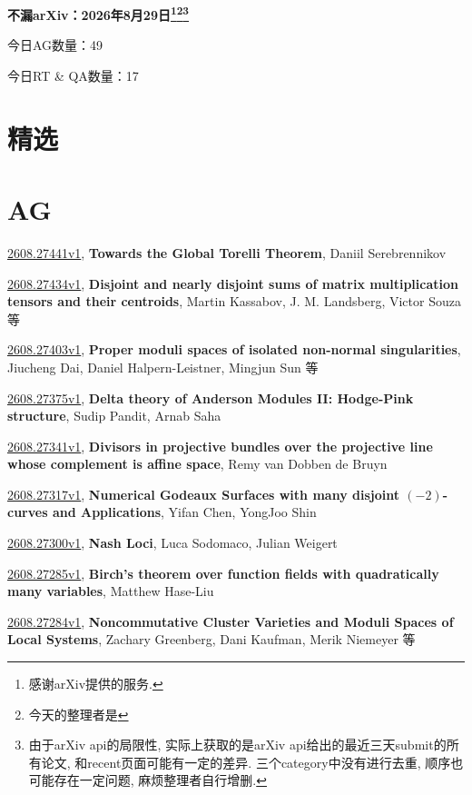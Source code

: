 \documentclass[9pt, a4paper]{article}
\theoremstyle{plain}
\theoremstyle{definition}
\theoremstyle{remark}
\newcommand{\arxiv}[3]{\href{https://arxiv.org/abs/#1}{#1}, \textbf{\textcolor{arxivblue}{#2}}, #3}
\newcommand{\AGnumber}{49}
\newcommand{\RTQAnumber}{17}
\newcommand{\NewestDate}{2026年8月29日}
\newcommand{\todayarXiver}{} %
\begin{document}
\begin{center}
    \Huge\textbf{不漏arXiv：\NewestDate\footnote{感谢arXiv提供的服务.}\footnote{今天的整理者是\todayarXiver}\footnote{由于arXiv api的局限性, 实际上获取的是arXiv api给出的最近三天submit的所有论文, 和recent页面可能有一定的差异. 三个category中没有进行去重, 顺序也可能存在一定问题, 麻烦整理者自行增删.}} \\
\end{center}

\setcounter{section}{-1}

\begin{center}
    今日AG数量：\AGnumber
    
    今日RT \& QA数量：\RTQAnumber
    
\end{center}


\section{精选}


\section{AG}
\arxiv{2608.27441v1}{Towards the Global Torelli Theorem}{Daniil Serebrennikov}

\arxiv{2608.27434v1}{Disjoint and nearly disjoint sums of matrix multiplication tensors and their centroids}{Martin Kassabov, J. M. Landsberg, Victor Souza 等}

\arxiv{2608.27403v1}{Proper moduli spaces of isolated non-normal singularities}{Jiucheng Dai, Daniel Halpern-Leistner, Mingjun Sun 等}

\arxiv{2608.27375v1}{Delta theory of Anderson Modules II: Hodge-Pink structure}{Sudip Pandit, Arnab Saha}

\arxiv{2608.27341v1}{Divisors in projective bundles over the projective line whose complement is affine space}{Remy van Dobben de Bruyn}

\arxiv{2608.27317v1}{Numerical Godeaux Surfaces with many disjoint $(-2)$-curves and Applications}{Yifan Chen, YongJoo Shin}

\arxiv{2608.27300v1}{Nash Loci}{Luca Sodomaco, Julian Weigert}

\arxiv{2608.27285v1}{Birch's theorem over function fields with quadratically many variables}{Matthew Hase-Liu}

\arxiv{2608.27284v1}{Noncommutative Cluster Varieties and Moduli Spaces of Local Systems}{Zachary Greenberg, Dani Kaufman, Merik Niemeyer 等}
\end{document}
